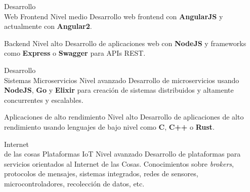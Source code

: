 \documentclass[hidelinks]{friggeri-cv} %
\begin{document}
\begin{entrylist}
 \entry
 {Desarrollo \\ Web}
 {Frontend}
 {Nivel medio}
 {
  Desarrollo web frontend con \textbf{AngularJS} y actualmente con \textbf{Angular2}.
 }

 \entry
 {}
 {Backend}
 {Nivel alto}
 {
  Desarrollo de aplicaciones web con \textbf{NodeJS} y frameworks como
  \textbf{Express} o \textbf{Swagger} para APIs REST.\@
 }

 \entry
 {Desarrollo \\ Sistemas}
 {Microservicios}
 {Nivel avanzado}
 {
  Desarrollo de microservicios usando \textbf{NodeJS}, \textbf{Go} y \textbf{Elixir}
  para creación de sistemas distribuidos y altamente concurrentes y escalables.
 }

 \entry
 {}
 {Aplicaciones de alto rendimiento}
 {Nivel alto}
 {
  Desarrollo de aplicaciones de alto rendimiento usando lenguajes de bajo nivel
  como \textbf{C}, \textbf{C++} o \textbf{Rust}.
 }

 \entry
 {Internet \\ de las cosas}
 {Plataformas IoT}
 {Nivel avanzado}
 {
  Desarrollo de plataformas para servicios orientados al Internet de las Cosas.
  Conocimientos sobre \textit{brokers}, protocolos de mensajes, sistemas integrados,
  redes de sensores, microcontroladores, recolección de datos, etc.
 }
\end{entrylist}

\end{document}

